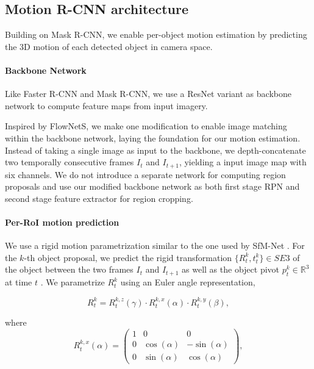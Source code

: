 
\subsection{Motion R-CNN architecture}

Building on Mask R-CNN, we enable per-object motion estimation by predicting the 3D motion of each detected object
in camera space.

\paragraph{Backbone Network}
Like Faster R-CNN and Mask R-CNN, we use a ResNet variant as backbone network to compute feature maps from input imagery.

Inspired by FlowNetS, we make one modification to enable image matching within the backbone network,
laying the foundation for our motion estimation. Instead of taking a single image as input to the backbone,
we depth-concatenate two temporally consecutive frames $I_t$ and $I_{t+1}$, yielding a input image map with six channels.
We do not introduce a separate network for computing region proposals and use our modified backbone network
as both first stage RPN and second stage feature extractor for region cropping.

\paragraph{Per-RoI motion prediction}
We use a rigid motion parametrization similar to the one used by SfM-Net \cite{Byravan:2017:SNL}.
For the $k$-th object proposal, we predict the rigid transformation $\{R_t^k, t_t^k\}\in SE3$
of the object between the two frames $I_t$ and $I_{t+1}$ as well as the object pivot $p_t^k \in \mathbb{R}^3$ at time $t$ .
We parametrize ${R_t^k}$ using an Euler angle representation,

\begin{equation}
R_t^k = R_t^{k,z}(\gamma) \cdot R_t^{k,x}(\alpha) \cdot R_t^{k,y}(\beta),
\end{equation}

where
\begin{equation}
R_t^{k,x}(\alpha) =
\begin{pmatrix}
  1 & 0 & 0 \\
  0 & \cos(\alpha) & -\sin(\alpha) \\
  0 & \sin(\alpha) & \cos(\alpha)
\end{pmatrix},
\end{equation}

